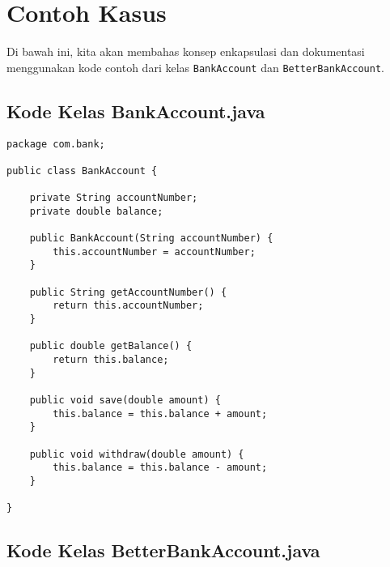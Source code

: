 \section{Contoh Kasus}

Di bawah ini, kita akan membahas konsep enkapsulasi dan dokumentasi menggunakan kode contoh dari kelas \texttt{BankAccount} dan \texttt{BetterBankAccount}.

\subsection{Kode Kelas BankAccount.java}

\begin{lstlisting}[style=JavaStyle, caption={Kode Java: BankAccount.java}]
package com.bank;

public class BankAccount {
	
	private String accountNumber;
	private double balance;
	
	public BankAccount(String accountNumber) {
		this.accountNumber = accountNumber;
	}
	
	public String getAccountNumber() {
		return this.accountNumber;
	}
	
	public double getBalance() {
		return this.balance;
	}
	
	public void save(double amount) {
		this.balance = this.balance + amount;
	}
	
	public void withdraw(double amount) {
		this.balance = this.balance - amount;
	}
	
}
\end{lstlisting}

\subsection{Kode Kelas BetterBankAccount.java}

